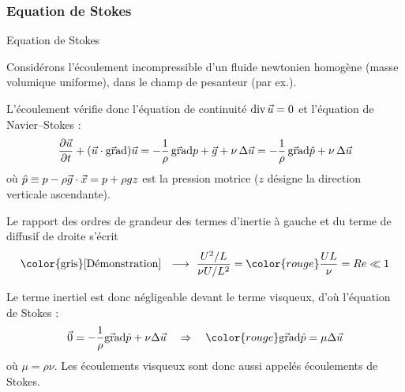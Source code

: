 \subsubsection{Equation de Stokes}
\begin{frame}{Equation de Stokes}

\small

Considérons l'écoulement incompressible d'un fluide newtonien homogène (masse volumique uniforme), dans le champ de pesanteur (par ex.).

\pause 

\medskip

L'écoulement vérifie donc l'équation de continuité 
$\mbox{\rm div}\, \vec{u} = 0$ et l'équation de Navier--Stokes :
\begin{equation}
  \displaystyle \frac{\partial \vec{u}}{\partial t} + (\vec{u} \cdot \vec{\mbox{\rm gra}}\mbox{\rm d}) \vec{u}
  =
  - \frac{1}{\rho} \, \vec{\mbox{\rm gra}}\mbox{\rm d} p + \vec{g} 
  + \nu \, \Delta \vec{u}
  =
  - \frac{1}{\rho} \, \vec{\mbox{\rm gra}}\mbox{\rm d} \hat{p} 
  + \nu \, \Delta \vec{u}  
\end{equation}
o\`u $\hat{p} \equiv p - \rho \vec{g} \cdot \vec{x} = p + \rho g z$ 
est la \textcolor{vert}{pression motrice}
($z$ désigne la direction verticale ascendante).

\bigskip

\pause

Le rapport des ordres de grandeur des termes d'inertie à gauche et du terme de diffusif de droite s'écrit
\begin{equation}
  \mbox{\color{gris} [Démonstration] \; $\longrightarrow$ \;} 
  \frac{U^2/L}{\nu U/L^2} = \color{rouge}\frac{UL}{\nu} = Re \ll 1
\end{equation}

\pause
\medskip

Le terme inertiel est donc négligeable devant le terme visqueux,
d'o\`u l'\textcolor{vert}{équation de Stokes} :
\begin{equation}
  \myvec{0} = -\frac{1}{\rho} \gradient{\hat{p}} 
  + \nu \Delta \myvec{u}
  \quad \Rightarrow \quad
  \color{rouge} \gradient{\hat{p}} = \mu \Delta \myvec{u}
\end{equation}
o\`u $\mu = \rho \nu$.
Les écoulements visqueux sont donc aussi appelés 
\textcolor{vert}{écoulements de Stokes}.

\vspace{10mm}

\end{frame}

